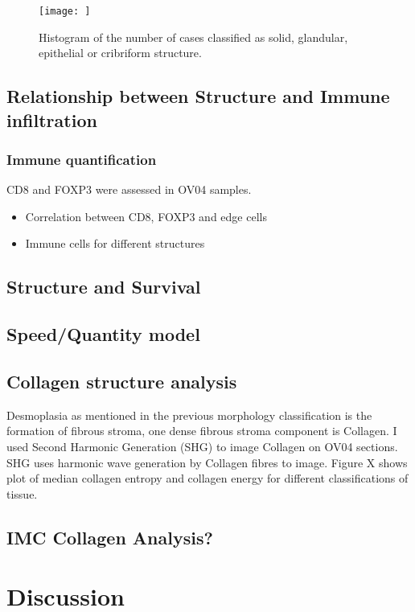 \begin{figure}
    \centering
    \texttt{[image: ]}
    \caption{Histogram of the number of cases classified as solid, glandular, epithelial  or cribriform structure.}
    \label{fig:num_classl}
\end{figure}


\subsection{Relationship between Structure and Immune infiltration}

\subsubsection{Immune quantification}

CD8 and FOXP3 were assessed in OV04 samples.
\begin{itemize}
    \item Correlation between CD8, FOXP3 and edge cells
    \item Immune cells for different structures
\end{itemize}

\subsection{Structure and Survival}

\subsection{Speed/Quantity model}


\subsection{Collagen structure analysis}
Desmoplasia as mentioned in the previous morphology classification is the formation of fibrous stroma, one dense fibrous stroma component is Collagen. I used Second Harmonic Generation (SHG) to image Collagen on OV04 sections. SHG uses harmonic wave generation by Collagen fibres to image. Figure X shows plot of median collagen entropy and collagen energy for different classifications of tissue.

\subsection{IMC Collagen Analysis?}

\section{Discussion}

